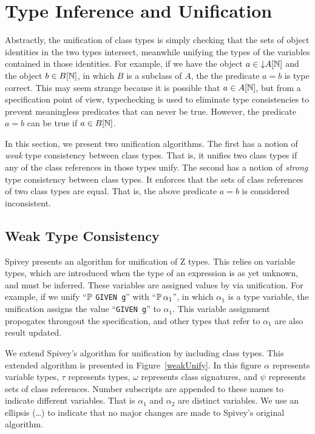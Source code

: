 \section{Type Inference and Unification}
\label{inference}

Abstractly, the unification of class types is simply checking that the
sets of object identities in the two types intersect, meanwhile
unifying the types of the variables contained in those identities. For
example, if we have the object $a \in \mathord\downarrow A[{\mathbb N}]$ and the object $b
\in B[{\mathbb N}]$, in which $B$ is a subclass of $A$, the the predicate $a
= b$ is type correct. This may seem strange because it is possible
that $a \in A[{\mathbb N}]$, but from a specification point of view,
typechecking is used to eliminate type consistencies to prevent
meaningless predicates that can never be true. However, the predicate
$a = b$ can be true if $a \in B[{\mathbb N}]$.

In this section, we present two unification algorithms. The first has
a notion of {\em weak} type consistency between class types. That is,
it unifies two class types if any of the class references in those
types unify. The second has a notion of {\em strong} type consistency
between class types. It enforces that the sets of class references of
two class types are equal. That is, the above predicate $a = b$
is considered inconsistent. 

\subsection{Weak Type Consistency}

Spivey \cite{spivey90} presents an algorithm for unification of Z
types. This relies on variable types, which are introduced when the
type of an expression is as yet unknown, and must be
inferred. These variables are assigned values by via unification. For
example, if we unify ``$\power$ {\tt GIVEN g}'' with ``$\power \alpha_1$'', in
which $\alpha_1$ is a type variable, the unification assigns the value
``{\tt GIVEN g}'' to $\alpha_1$. This variable assignment propogates
througout the specification, and other types that refer to $\alpha_1$
are also result updated.

We extend Spivey's algorithm for unification by including class
types. This extended algorithm is presented in
Figure~\ref{weakUnify}. In this figure $\alpha$ represents variable
types, $\tau$ represents types, $\omega$ represents class signatures,
and $\psi$ represents sets of class references. Number subscripts are
appended to these names to indicate different variables. That is
$\alpha_1$ and $\alpha_2$ are distinct variables. We use an ellipsis
(\ldots) to indicate that no major changes are made to Spivey's
original algorithm.

